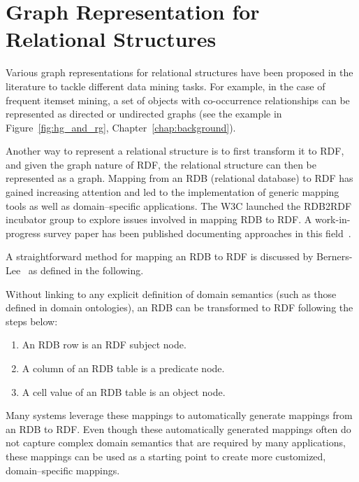 \section{Graph Representation for Relational Structures}
\label{sec:graph-rep-for-rdb}
Various graph representations for relational structures have been proposed in the literature to tackle different data mining tasks. For example, in the case of frequent itemset mining, a set of objects with co-occurrence relationships can be represented as directed or undirected graphs (see the example in Figure~\ref{fig:hg_and_rg}, Chapter~\ref{chap:background}).

Another way to represent a relational structure is to first transform it to RDF, and given the graph nature of RDF, the relational structure can then be represented as a graph. Mapping from an RDB (relational database) to RDF has gained increasing attention and led to the implementation of generic mapping tools as well as domain--specific applications.  The W3C launched the RDB2RDF incubator group to explore issues involved in mapping RDB to RDF. A work-in-progress survey paper has been published documenting approaches in this field~\cite{RDB2RDF}.

A straightforward method for mapping an RDB to RDF is discussed by Berners-Lee~\cite{TBL98} as defined in the following.

\begin{mydef}
Without linking to any explicit definition of domain semantics (such as those defined in domain ontologies), an RDB can be transformed to RDF following the steps below:
\begin{enumerate}
\label{auto-map}
\item An RDB row is an RDF subject node.
\item A column of an RDB table is a predicate node.
\item A cell value of an RDB table is an object node.
\end{enumerate}
\end{mydef}

Many systems leverage these mappings to automatically generate mappings from an RDB to RDF. Even though these automatically generated mappings often do not capture complex domain semantics that are required by many applications, these mappings can be used as a starting point to create more customized, domain--specific mappings.

